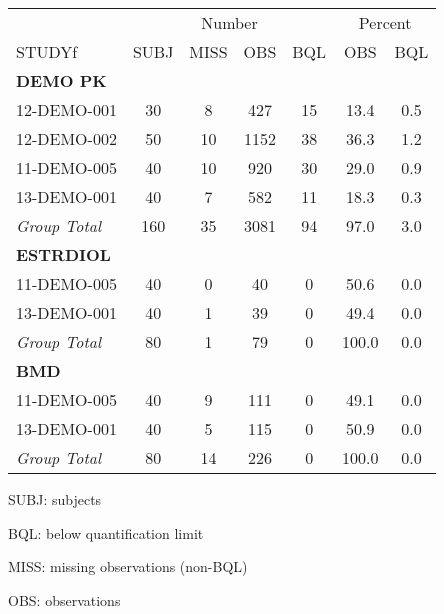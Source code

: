 \setlength{\tabcolsep}{5pt} 
\begin{threeparttable}
\renewcommand{\arraystretch}{1.3}
\begin{tabular}[h]{lcccccc}
\hline
\multicolumn{1}{c}{} & \multicolumn{4}{c}{Number} & \multicolumn{2}{c}{Percent} \\
\cmidrule(lr){2-5}
\cmidrule(lr){6-7}
STUDYf & SUBJ & MISS & OBS & BQL & OBS & BQL \\
\hline
\multicolumn{7}{l}{\textbf{DEMO PK}}\\
12-DEMO-001 & 30 & 8 & 427 & 15 & 13.4 & 0.5 \\
12-DEMO-002 & 50 & 10 & 1152 & 38 & 36.3 & 1.2 \\
11-DEMO-005 & 40 & 10 & 920 & 30 & 29.0 & 0.9 \\
13-DEMO-001 & 40 & 7 & 582 & 11 & 18.3 & 0.3 \\
\hline {\it Group Total} & 160 & 35 & 3081 & 94 & 97.0 & 3.0 \\
\hline \multicolumn{7}{l}{\textbf{ESTRDIOL}}\\
11-DEMO-005 & 40 & 0 & 40 & 0 & 50.6 & 0.0 \\
13-DEMO-001 & 40 & 1 & 39 & 0 & 49.4 & 0.0 \\
\hline {\it Group Total} & 80 & 1 & 79 & 0 & 100.0 & 0.0 \\
\hline \multicolumn{7}{l}{\textbf{BMD}}\\
11-DEMO-005 & 40 & 9 & 111 & 0 & 49.1 & 0.0 \\
13-DEMO-001 & 40 & 5 & 115 & 0 & 50.9 & 0.0 \\
\hline {\it Group Total} & 80 & 14 & 226 & 0 & 100.0 & 0.0 \\
\hline
\end{tabular}
\begin{tablenotes}[flushleft]
\item SUBJ: subjects
\item BQL: below quantification limit
\item MISS: missing observations (non-BQL)
\item OBS: observations
\end{tablenotes}
\end{threeparttable}
